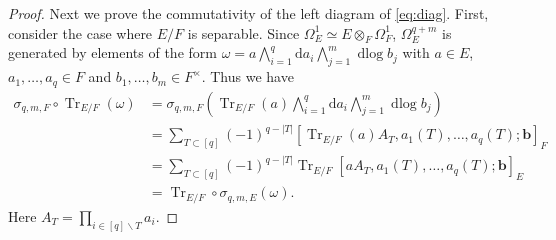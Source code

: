\documentclass[a4paper,12pt,reqno]{amsart}
\numberwithin{equation}{section}
\theoremstyle{definition}
\DeclareMathOperator{\dlog}{dlog}
\DeclareMathOperator{\Tr}{Tr}
\renewcommand{\d}{\mathrm{d}}
\newcommand{\vb}{\mathbf{b}}
\begin{document}
\begin{proof}
    Next we prove the commutativity of the left diagram of \eqref{eq:diag}.
    First, consider the case where $E/F$ is separable. Since $\Omega_E^1 \simeq E\otimes_F \Omega_F^1$, 
    $\Omega^{q+m}_E$ is generated by elements of the form $\omega=a\bigwedge_{i=1}^q\d a_i\bigwedge_{j=1}^m\dlog b_j$ with $a\in E$, $a_1,\dots, a_q\in F$ and $b_1,\dots,b_m\in F^\times$.
    Thus we have
    \begin{align*}
        \sigma_{q,m,F}\circ\Tr_{E/F}(\omega)
        &=\sigma_{q,m,F}(\Tr_{E/F}(a)\bigwedge_{i=1}^q\d a_i\bigwedge_{j=1}^m\dlog b_j)\\
        &=\sum_{T\subset[q]}(-1)^{q-|T|}
        \left[
        \Tr_{E/F}(a)A_T%
        ,a_1(T),\ldots,a_q(T);\vb\right]_F\\
        &=\sum_{T\subset[q]}(-1)^{q-|T|}
        \Tr_{E/F}\left[
        aA_T%
        ,a_1(T),\ldots,a_q(T);\vb\right]_E\\
        &=\Tr_{E/F}\circ \sigma_{q,m,E}(\omega).
    \end{align*}
     Here $A_T=\prod_{i\in [q]\smallsetminus T}a_i$.
    

\end{proof}
\end{document}
